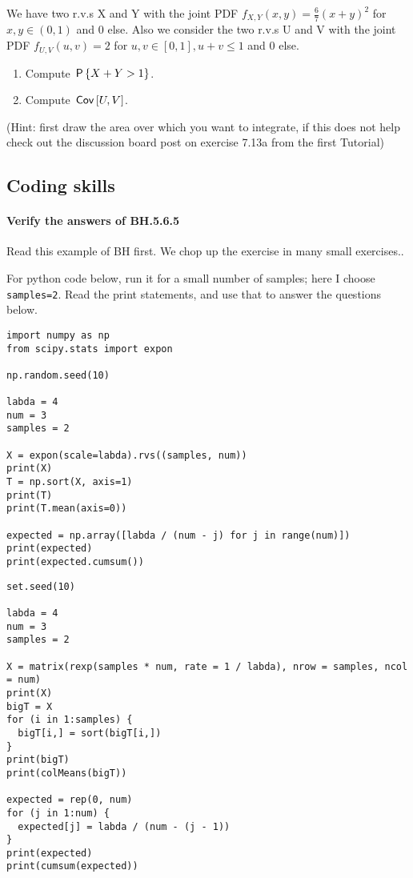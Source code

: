 \documentclass[assignments]{subfiles}
\begin{document}
\begin{exercise}
We have two r.v.s X and Y with the joint PDF $f_{X,Y}(x,y) = \frac{6}{7}(x+y)^2$ for $x, y \in (0,1)$ and 0 else. Also we consider the two r.v.s U and V with the joint PDF $f_{U,V}(u,v) = 2$ for $u, v \in [0,1], u+v \leq 1$ and 0 else.
\begin{enumerate}
\item Compute $\P{X+Y>1}$.
\item Compute $\cov{U,V}$.
\end{enumerate}
(Hint: first draw the area over which you want to integrate, if this does not help check out the discussion board post on exercise 7.13a from the first Tutorial)
\end{exercise}


\subsection{Coding skills}
\label{sec:progr-assignm}


\paragraph{Verify the answers of BH.5.6.5}
Read this example of BH first.
We chop up the exercise in many small exercises..


For python code below, run it for a small number of samples; here I choose \texttt{samples=2}. Read the print statements, and use that to answer the questions below.

\begin{verbatim}
import numpy as np
from scipy.stats import expon

np.random.seed(10)

labda = 4
num = 3
samples = 2

X = expon(scale=labda).rvs((samples, num))
print(X)
T = np.sort(X, axis=1)
print(T)
print(T.mean(axis=0))

expected = np.array([labda / (num - j) for j in range(num)])
print(expected)
print(expected.cumsum())
\end{verbatim}


\begin{verbatim}
set.seed(10)

labda = 4
num = 3
samples = 2

X = matrix(rexp(samples * num, rate = 1 / labda), nrow = samples, ncol = num)
print(X)
bigT = X
for (i in 1:samples) {
  bigT[i,] = sort(bigT[i,])
}
print(bigT)
print(colMeans(bigT))

expected = rep(0, num)
for (j in 1:num) {
  expected[j] = labda / (num - (j - 1))
}
print(expected)
print(cumsum(expected))
\end{verbatim}
\end{document}
